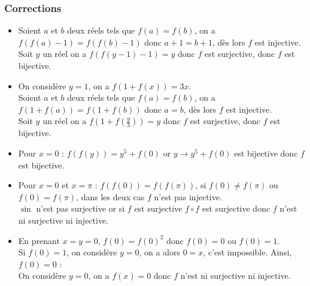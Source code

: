 \subsubsection{Corrections}
\begin{sol}[][1]
\begin{itemize}
    \item Soient $a$ et $b$ deux réels tels que $f(a)=f(b)$, on a $f(f(a)-1)=f(f(b)-1)$ donc $a+1=b+1$, dès lors $f$ est injective.\\
    Soit $y$ un réel on a $f(f(y-1)-1)=y$ donc $f$ est surjective, donc $f$ est bijective.
    \item On considère $y=1$, on a $f(1+f(x))=3x$.\\ 
    Soient $a$ et $b$ deux réels tels que $f(a)=f(b)$, on a $f(1+f(a))=f(1+f(b))$ donc $a=b$, dès lors $f$ est injective.\\
    Soit $y$ un réel on a $f(1+f(\frac y3))=y$ donc $f$ est surjective, donc $f$ est bijective.
    \item Pour $x=0$ : $f(f(y))=y^5+f(0)$ or $y\to y^5+f(0)$ est bijective donc $f$ est bijective.
    \item Pour $x=0$ et $x=\pi$ : $f(f(0))=f(f(\pi))$, si $f(0)\ne f(\pi)$ ou $f(0)=f(\pi)$, dans les deux cas $f$ n'est pas injective.\\
    $\sin$ n'est pas surjective or si $f$ est surjective $f\circ f$ est surjective donc $f$ n'est ni surjective ni injective.
    \item En prenant $x=y=0$, $f(0)=f(0)^2$ donc $f(0)=0$ ou $f(0)=1$.\\
    Si $f(0)=1$, on considère $y=0$, on a alors $0=x$, c'est impossible. Ainsi, $f(0)=0$ :\\
    On considère $y=0$, on a $f(x)=0$ donc $f$ n'est ni surjective ni injective.
\end{itemize}
\end{sol}

